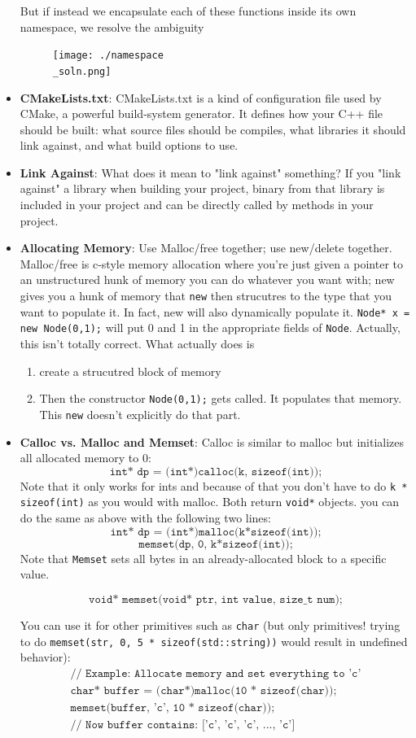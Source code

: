 \documentclass[12pt]{article}
\begin{document}
\begin{itemize}
But if instead we encapsulate each of these functions inside its own namespace, we resolve the ambiguity
\begin{figure}[H]
    \centering
    \texttt{[image: ./namespace\\\_soln.png]} %
\end{figure}
\item \textbf{CMakeLists.txt}: CMakeLists.txt is a kind of configuration file used by CMake, a powerful build-system generator. It defines how your C++ file should be built: what source files should be compiles, what libraries it should link against, and what build options to use.
\item \textbf{Link Against}: What does it mean to "link against" something? If you "link against" a library when building your project, binary from that library is included in your project and can be directly called by methods in your project. 
\item \textbf{Allocating Memory}: Use Malloc/free together; use new/delete together. Malloc/free is c-style memory allocation where you're just given a pointer to an unstructured hunk of memory you can do whatever you want with; new gives you a hunk of memory that \texttt{new} then strucutres to the type that you want to populate it. In fact, new will also dynamically populate it. \texttt{Node* x = new Node(0,1);} will put 0 and 1 in the appropriate fields of \texttt{Node}. Actually, this isn't totally correct. What  actually does is 
\begin{enumerate}
\item create a strucutred block of memory 
\item Then the constructor \texttt{Node(0,1);} gets called. It populates that memory. This \texttt{new} doesn't explicitly do that part. 
\end{enumerate}
\item \textbf{Calloc vs. Malloc and Memset}: Calloc is similar to malloc but initializes all allocated memory to 0:
\[\texttt{int* dp = (int*)calloc(k, sizeof(int));}\]
Note that it only works for ints and because of that you don't have to do \texttt{k * sizeof(int)} as you would with malloc. Both return \texttt{void*} objects. you can do the same as above with the following two lines: 
\[\texttt{int* dp = (int*)malloc(k*sizeof(int));}\]
\[\texttt{memset(dp, 0, k*sizeof(int));}\]
Note that \texttt{Memset} sets all bytes in an already-allocated block to a specific value. 

\[\texttt{void* memset(void* ptr, int value, size\_t num);}\]

You can use it for other primitives such as \texttt{char} (but only primitives! trying to do \texttt{memset(str, 0, 5 * sizeof(std::string))} would result in undefined behavior):
\[
\begin{array}{l}
\texttt{// Example: Allocate memory and set everything to 'c'} \\
\texttt{char* buffer = (char*)malloc(10 * sizeof(char));} \\
\texttt{memset(buffer, 'c', 10 * sizeof(char));} \\
\texttt{// Now buffer contains: ['c', 'c', 'c', ..., 'c']}
\end{array}
\]
\end{itemize}
\end{document}
